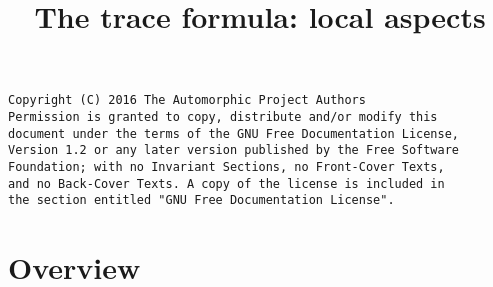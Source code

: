 

%


\title{The trace formula: local aspects}


\maketitle

\label{section-phantom}

\begin{verbatim}
Copyright (C) 2016 The Automorphic Project Authors
Permission is granted to copy, distribute and/or modify this
document under the terms of the GNU Free Documentation License,
Version 1.2 or any later version published by the Free Software
Foundation; with no Invariant Sections, no Front-Cover Texts,
and no Back-Cover Texts. A copy of the license is included in
the section entitled "GNU Free Documentation License".
\end{verbatim}

\tableofcontents


\section{Overview}
\label{section-overview}

\noindent









